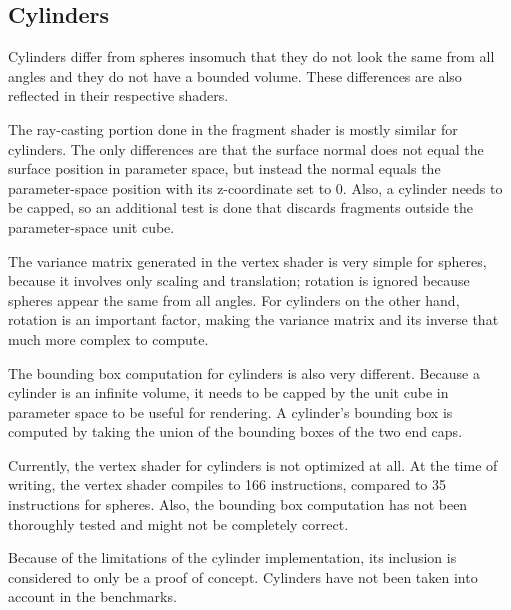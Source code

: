 \subsection*{Cylinders}

Cylinders differ from spheres insomuch that they do not look the same from all angles and they do not have a bounded volume.
These differences are also reflected in their respective shaders.

The ray-casting portion done in the fragment shader is mostly similar for cylinders. 
The only differences are that the surface normal does not equal the surface position in parameter space, 
but instead the normal equals the parameter-space position with its z-coordinate set to $0$.
Also, a cylinder needs to be capped, so an additional test is done that discards fragments outside the parameter-space unit cube.

The variance matrix generated in the vertex shader is very simple for spheres, because it involves only scaling and translation;
rotation is ignored because spheres appear the same from all angles. 
For cylinders on the other hand, rotation is an important factor, making the variance matrix and its inverse that much more complex to compute.

The bounding box computation for cylinders is also very different. 
Because a cylinder is an infinite volume, it needs to be capped by the unit cube in parameter space to be useful for rendering.
A cylinder's bounding box is computed by taking the union of the bounding boxes of the two end caps.

Currently, the vertex shader for cylinders is not optimized at all. 
At the time of writing, the vertex shader compiles to 166 instructions, compared to 35 instructions for spheres.
Also, the bounding box computation has not been thoroughly tested and might not be completely correct.

Because of the limitations of the cylinder implementation, its inclusion is considered to only be a proof of concept. 
Cylinders have not been taken into account in the benchmarks.
